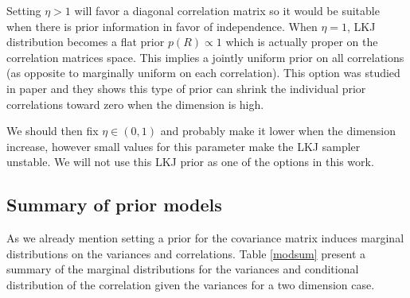 \documentclass{article}
\begin{document}
Setting $\eta > 1$ will favor a diagonal correlation matrix so it would be suitable when there is prior information in favor of independence.  When $\eta=1$, LKJ distribution becomes a flat prior $p(R) \propto 1$ which is actually proper on the correlation matrices space. This implies a jointly uniform prior on all correlations (as opposite to marginally uniform on each correlation). This option was studied in \cite{barnard2000}  paper and they shows this type of prior can shrink the individual prior correlations  toward zero when the dimension is high.   

We should then fix $\eta \in (0,1)$ and probably make it lower when the dimension increase, however small values for this parameter make the LKJ sampler unstable. We will not use this LKJ prior as one of the options in this work. 

\subsection{Summary of prior models} 

As we already mention setting a prior for the covariance matrix induces marginal distributions on the variances and correlations. 
Table \ref{modsum} present a summary of the marginal distributions for the variances and conditional distribution of the correlation given the variances for a two dimension case. 
\end{document}
